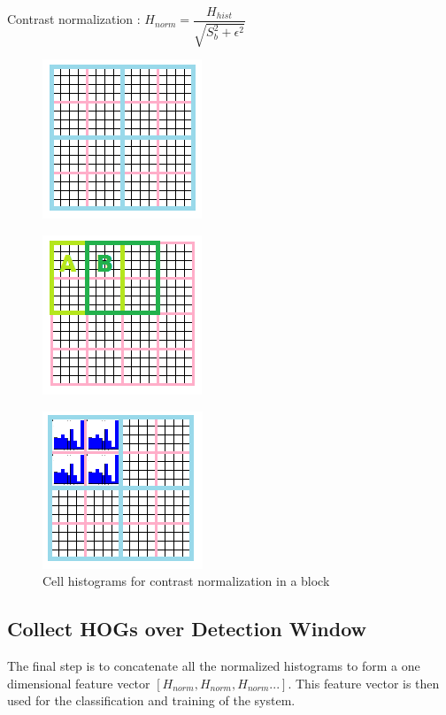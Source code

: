Contrast normalization : $H_{norm} = \dfrac{H_{hist}}{\sqrt{S_b  ^2 + \epsilon ^2}}$
\begin{figure}[H]
\centering
\begin{minipage}{.5\textwidth}
  \centering
  \includegraphics[width=.4\linewidth]{blocks}
  \label{fig:test1}
\end{minipage}%
\begin{minipage}{.5\textwidth}
  \centering
  \includegraphics[width=.4\linewidth]{overlap}
  \label{fig:test2}
\end{minipage}
\end{figure}

\begin{figure}[H]
  \centering
  \includegraphics[scale=0.8]{norm}
  \caption{Cell histograms for contrast normalization in a block}
\end{figure}

\subsection{Collect HOGs over Detection Window}
The final step is to concatenate all the normalized histograms to form a one dimensional feature vector $[H_{norm}, H_{norm}, H_{norm}...]$. This feature vector is then used for the classification and training of the system.

